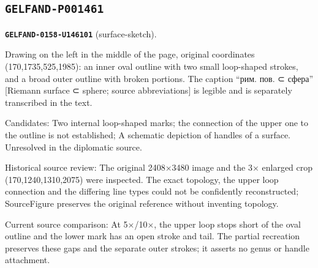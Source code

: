 \subsection*{\texttt{GELFAND-P001461}}
\par\noindent\leavevmode{}\label{GELFAND-0158-U146101}\label{GELFAND-P001461:surface-sketch}\textbf{\texttt{GELFAND-0158-U146101}} (surface-sketch).\nopagebreak[4]\par
Drawing on the left in the middle of the page, original coordinates (170,1735,525,1985): an inner oval outline with two small loop-shaped strokes, and a broad outer outline with broken portions. The caption “рим. пов. ⊂ сфера” [Riemann surface ⊂ sphere; source abbreviations] is legible and is separately transcribed in the text.\par
Candidates: Two internal loop-shaped marks; the connection of the upper one to the outline is not established; A schematic depiction of handles of a surface. Unresolved in the diplomatic source.\par
Historical source review: The original 2408×3480 image and the 3× enlarged crop (170,1240,1310,2075) were inspected. The exact topology, the upper loop connection and the differing line types could not be confidently reconstructed; SourceFigure preserves the original reference without inventing topology.\par
Current source comparison: At 5×/10×, the upper loop stops short of the oval outline and the lower mark has an open stroke and tail. The partial recreation preserves these gaps and the separate outer strokes; it asserts no genus or handle attachment.\par\medskip
